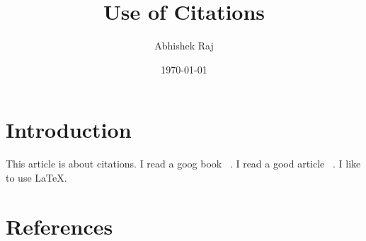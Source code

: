 \documentclass{article}
\title{Use of Citations}
\author{Abhishek Raj}
\date{\today}
\begin{document}
	\maketitle
	
	\section{Introduction}
	This article is about citations. I read a goog book ~\cite{how_to}. I read a good article ~\cite{it}. I like to use \LaTeX.
	
	\section{References}
	
	
\end{document}
